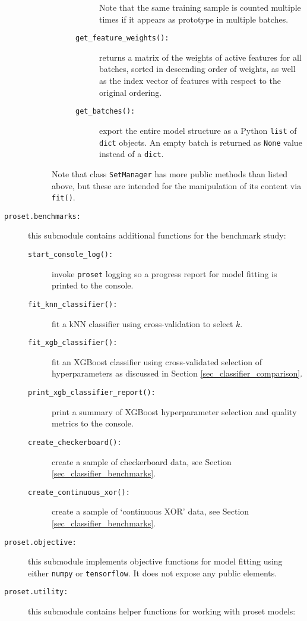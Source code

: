 \begin{description}
\begin{description}
\begin{description}
\begin{description}
Note that the same training sample is counted multiple times if it appears as prototype in multiple batches.
%
\item[\texttt{get\_feature\_weights():}] returns a matrix of the weights of active features for all batches, sorted in descending order of weights, as well as the index vector of features with respect to the original ordering.
%
\item[\texttt{get\_batches():}] export the entire model structure as a Python \texttt{list} of \texttt{dict} objects.
An empty batch is returned as \texttt{None} value instead of a \texttt{dict}.
\end{description}
\end{description}
%
Note that class \texttt{SetManager} has more public methods than listed above, but these are intended for the manipulation of its content via \texttt{fit()}.
%
\end{description}
%
\item[\texttt{proset.benchmarks:}] this submodule contains additional functions for the benchmark study:
%
\begin{description}
\item[\texttt{start\_console\_log():}] invoke \texttt{proset} logging so a progress report for model fitting is printed to the console.
%
\item[\texttt{fit\_knn\_classifier():}] fit a kNN classifier using cross-validation to select $k$.
%
\item[\texttt{fit\_xgb\_classifier():}] fit an XGBoost classifier using cross-validated selection of hyperparameters as discussed in Section \ref{sec_classifier_comparison}.
%
\item[\texttt{print\_xgb\_classifier\_report():}] print a summary of XGBoost hyperparameter selection and quality metrics to the console.
%
\item[\texttt{create\_checkerboard():}] create a sample of checkerboard data, see Section \ref{sec_classifier_benchmarks}.
%
\item[\texttt{create\_continuous\_xor():}] create a sample of `continuous XOR' data, see Section \ref{sec_classifier_benchmarks}.
\end{description}
%
\item[\texttt{proset.objective:}] this submodule implements objective functions for model fitting using either \texttt{numpy} or \texttt{tensorflow}.
It does not expose any public elements.
%
\item[\texttt{proset.utility:}] this submodule contains helper functions for working with proset models:

\end{description}
